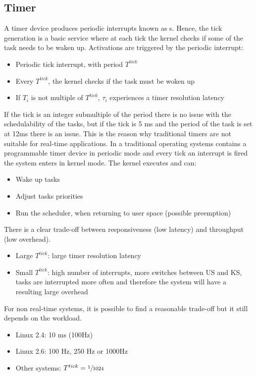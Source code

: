 \subsection{Timer}
A timer device produces periodic interrupts known as s.
Hence, the tick generation is a basic service where at each tick the kernel checks if some of the task needs to be waken up.
Activations are triggered by the periodic interrupt:
\begin{itemize}
    \item Periodic tick interrupt, with period $T^{tick}$
    \item Every $T^{tick}$, the kernel checks if the task must be woken up
    \item If $T_i$ is not multiple of $T^{tick}$, $\tau_i$ experiences a timer resolution latency
\end{itemize}
If the tick is an integer submultiple of the period there is no issue with the schedulability of the tasks, but if the tick is 5 ms and the period of the task is set at 12ms there is an issue. This is the reason why traditional timers are not suitable for real-time applications. In a traditional operating systems contains a programmable timer device in periodic mode and every tick an interrupt is fired the system enters in kernel mode.
The kernel executes and can:
\begin{itemize}
    \item Wake up tasks
    \item Adjust tasks priorities
    \item Run the scheduler, when returning to user space (possible preemption)
\end{itemize}

There is a clear trade-off between responsiveness (low latency) and throughput (low overhead).
\begin{itemize}
    \item Large $T^{tick}$: large timer resolution latency
    \item Small $T^{tick}$: high number of interrupts, more switches between US and KS, tasks are interrupted more often and therefore the system will have a resulting large overhead
\end{itemize}

For non real-time systems, it is possible to find a reasonable trade-off but it still depends on the workload.
{
    \begin{itemize}
        \item Linux 2.4: 10 ms (100Hz)
        \item Linux 2.6: 100 Hz, 250 Hz or 1000Hz
        \item Other systems: $T^{tick} = \sfrac{1}{1024}$
    \end{itemize}
}

